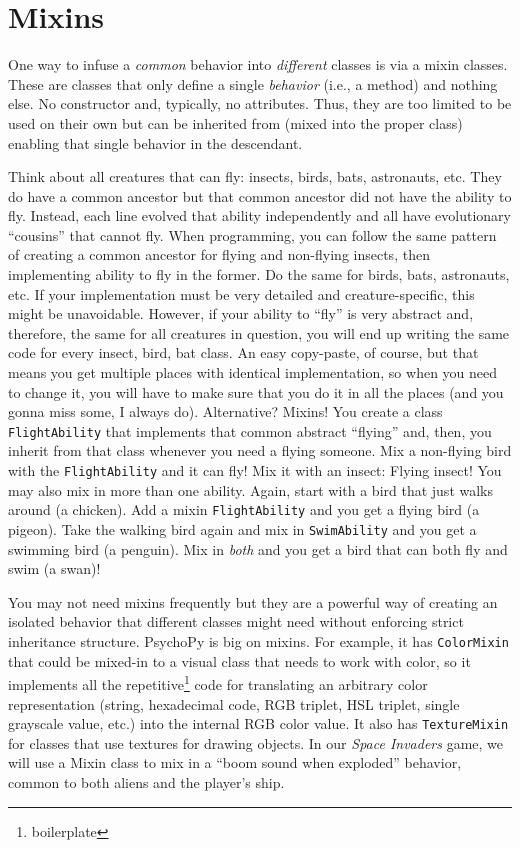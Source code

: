 \documentclass[
]{book}
\begin{document}
\hypertarget{mixins}{%
\section{Mixins}\label{mixins}}

One way to infuse a \emph{common} behavior into \emph{different} classes is via a mixin classes. These are classes that only define a single \emph{behavior} (i.e., a method) and nothing else. No constructor and, typically, no attributes. Thus, they are too limited to be used on their own but can be inherited from (mixed into the proper class) enabling that single behavior in the descendant.

Think about all creatures that can fly: insects, birds, bats, astronauts, etc. They do have a common ancestor but that common ancestor did not have the ability to fly. Instead, each line evolved that ability independently and all have evolutionary ``cousins'' that cannot fly. When programming, you can follow the same pattern of creating a common ancestor for flying and non-flying insects, then implementing ability to fly in the former. Do the same for birds, bats, astronauts, etc. If your implementation must be very detailed and creature-specific, this might be unavoidable. However, if your ability to ``fly'' is very abstract and, therefore, the same for all creatures in question, you will end up writing the same code for every insect, bird, bat class. An easy copy-paste, of course, but that means you get multiple places with identical implementation, so when you need to change it, you will have to make sure that you do it in all the places (and you gonna miss some, I always do). Alternative? Mixins! You create a class \texttt{FlightAbility} that implements that common abstract ``flying'' and, then, you inherit from that class whenever you need a flying someone. Mix a non-flying bird with the \texttt{FlightAbility} and it can fly! Mix it with an insect: Flying insect! You may also mix in more than one ability. Again, start with a bird that just walks around (a chicken). Add a mixin \texttt{FlightAbility} and you get a flying bird (a pigeon). Take the walking bird again and mix in \texttt{SwimAbility} and you get a swimming bird (a penguin). Mix in \emph{both} and you get a bird that can both fly and swim (a swan)!

You may not need mixins frequently but they are a powerful way of creating an isolated behavior that different classes might need without enforcing strict inheritance structure. PsychoPy is big on mixins. For example, it has \texttt{ColorMixin} that could be mixed-in to a visual class that needs to work with color, so it implements all the repetitive\footnote{boilerplate} code for translating an arbitrary color representation (string, hexadecimal code, RGB triplet, HSL triplet, single grayscale value, etc.) into the internal RGB color value. It also has \texttt{TextureMixin} for classes that use textures for drawing objects. In our \emph{Space Invaders} game, we will use a Mixin class to mix in a ``boom sound when exploded'' behavior, common to both aliens and the player's ship.
\end{document}
